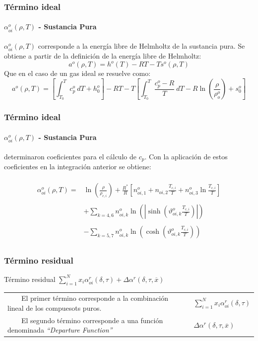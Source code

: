\documentclass[aspectratio=1610,multi,rgb]{beamer}
\newcommand{\tabitem}{~~\llap{\textbullet}~~}
\begin{document}
\begin{frame}
	\frametitle{Término ideal}
	\framesubtitle{$\alpha_{oi}^o(\rho,T)$ - Sustancia Pura}
	$\alpha_{oi}^o(\rho,T)$ corresponde a la energía libre de Helmholtz de
	la sustancia pura.
	Se obtiene a partir de la definición de la energía libre de Helmholtz:
	\begin{equation}
	a^o(\rho,T) = h^o(T)- RT - Ts^o(\rho,T)
	\end{equation}
	Que en el caso de un gas ideal se resuelve como:
	\begin{equation}
	a^o(\rho,T) = \left[\int_{{T_0}}^{{T}} {c_p^o} \: d{T} +h_0^o\right]
	 -RT - T \left[
		 \int_{{T_0}}^{{T}} {\frac{c_p^o-R}{T} } \: d{T} 
		 - R \ln \left(\frac{\rho}{\rho_o^o}\right) + s_0^o
		\right]
	\end{equation}

\end{frame}

\begin{frame}[t]
	\frametitle{Término ideal}
	\framesubtitle{$\alpha_{oi}^o(\rho,T)$ - Sustancia Pura}
	\cite{jaeschke_92} determinaron coeficientes para
	el cálculo de $c_p$. Con la aplicación de estos coeficientes en la
	integración anterior se obtiene:
	\\~\\	
	\begin{equation}
	\begin{aligned}
	\alpha_{oi}^o(\rho,T) =
		&  \ln \left(\frac{\rho}{\rho_{c,i}}\right) +
		\frac{R^*}{R} \left[n_{oi,1}^o + n_{oi,2} \frac{T_{c,i}}{T} +
		n_{oi,3}^o \ln\frac{T_{c,i}}{T}\right] \\~\\
		& + \sum\limits_{k=4,6} n_{oi,k}^o \ln
		\left(\left| \sinh
		\left(\vartheta_{oi,k}^o
			\frac{T_{c,i}}{T}
		\right) \right| \right)\\~\\
		& - \sum\limits_{k=5,7} n_{oi,k}^o \ln
		\left( \cosh
		\left(\vartheta_{oi,k}^o
			\frac{T_{c,i}}{T}
		\right) \right)\\
	\end{aligned}
	\end{equation}
\end{frame}


\subsubsection{Término residual}

\begin{frame}{Término residual}
	{$\sum\limits_{i=1}^N x_i\alpha_{oi}^r(\delta,\tau)
		+ \Delta\alpha^r(\delta,\tau,\overline{x})$}
		\begin{tabular}{p{}p{}<{\centering}}
	\tabitem El primer término corresponde a la combinación
		lineal de los compuesots puros.
	&
	$\sum\limits_{i=1}^N x_i\alpha_{oi}^r(\delta,\tau)$
	\\
	\tabitem El segundo término corresponde a una función denominada
	\emph{``Departure Function''}
	&
	$\Delta\alpha^r(\delta,\tau,\overline{x})$ \\
	\end{tabular}
\end{frame}
\end{document}
